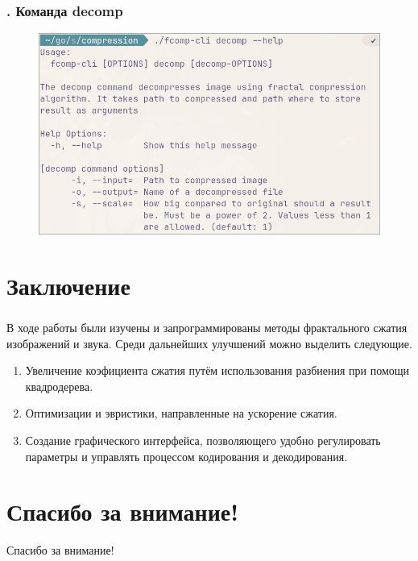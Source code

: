 \documentclass[t aspectratio=169]{beamer}
\begin{document}
  \begin{frame}\frametitle{\insertsection. Команда decomp}
   \begin{figure}
    \begin{center}
      \includegraphics[width=\textwidth]{./images/cli-decomp.png}
    \end{center}
   \end{figure}
  \end{frame}

  \section{Заключение}
  \begin{frame}\frametitle{\insertsection}
    \large
    В ходе работы были изучены и запрограммированы методы фрактального сжатия изображений и звука. Среди дальнейших улучшений можно выделить следующие.
    \begin{enumerate}
      \item Увеличение коэфициента сжатия путём использования разбиения при помощи квадродерева.
      \item Оптимизации и эвристики, направленные на ускорение сжатия.
      \item Создание графического интерфейса, позволяющего удобно регулировать параметры и управлять процессом кодирования и декодирования.
    \end{enumerate}
    \normalfont
  \end{frame}

  \section*{Спасибо за внимание!}
  \begin{frame}
    \begin{center}
      \huge Спасибо за внимание!\normalfont
    \end{center}
  \end{frame}
\end{document}

